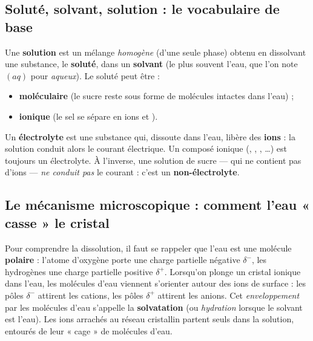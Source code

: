 \documentclass[11pt,a4paper]{article}
\begin{document}
\subsection{Soluté, solvant, solution : le vocabulaire de base}

\begin{definition}
Une \textbf{solution} est un mélange \emph{homogène} (d'une seule phase) obtenu en dissolvant une
substance, le \textbf{soluté}, dans un \textbf{solvant} (le plus souvent l'eau, que l'on note $(aq)$
pour \emph{aqueux}). Le soluté peut être :
\begin{itemize}[leftmargin=1.6em,topsep=2pt,itemsep=1pt]
  \item \textbf{moléculaire} (le sucre  reste sous forme de molécules intactes dans l'eau) ;
  \item \textbf{ionique} (le sel  se sépare en ions  et ).
\end{itemize}
\end{definition}

\begin{definition}[électrolyte]
Un \textbf{électrolyte} est une substance qui, dissoute dans l'eau, libère des \textbf{ions} : la
solution conduit alors le courant électrique. Un composé ionique (, ,
, \dots) est toujours un électrolyte. À l'inverse, une solution de sucre — qui ne contient
pas d'ions — \emph{ne conduit pas} le courant : c'est un \textbf{non-électrolyte}.
\end{definition}

\subsection{Le mécanisme microscopique : comment l'eau « casse » le cristal}

Pour comprendre la dissolution, il faut se rappeler que l'eau est une molécule \textbf{polaire} :
l'atome d'oxygène porte une charge partielle négative $\delta^-$, les hydrogènes une charge partielle
positive $\delta^+$. Lorsqu'on plonge un cristal ionique dans l'eau, les molécules d'eau viennent
s'orienter autour des ions de surface : les pôles $\delta^-$ attirent les cations, les pôles $\delta^+$
attirent les anions. Cet \emph{enveloppement} par les molécules d'eau s'appelle la
\textbf{solvatation} (ou \emph{hydration} lorsque le solvant est l'eau). Les ions arrachés au réseau
cristallin partent seuls dans la solution, entourés de leur « cage » de molécules d'eau.
\end{document}
